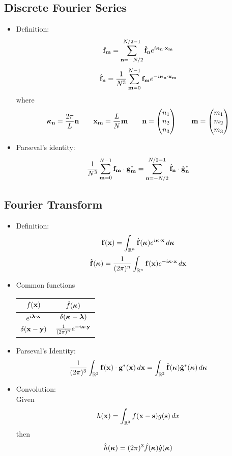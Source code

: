 \documentclass[oneside,a4paper,11pt]{article}
\begin{document}
\subsection{Discrete Fourier Series}
\begin{itemize}
\item Definition:
\[\mathbf{f}_{\mathbf{m}} = \sum_{\mathbf{n}=-N/2}^{N/2-1} \hat{\mathbf{f}}_{\mathbf{n}} e^{i \boldsymbol\kappa_{\mathbf{n}} \cdot \mathbf{x}_{\mathbf{m}}}\]
\[\hat{\mathbf{f}}_{\mathbf{n}} =\frac{1}{N^3}\sum_{\mathbf{m}=0}^{N-1} \mathbf{f}_{\mathbf{m}} e^{-i \boldsymbol\kappa_{\mathbf{n}} \cdot \mathbf{x}_{\mathbf{m}}}\]
 where 
 \[ \boldsymbol\kappa_{\mathbf{n}} = \frac{2 \pi}{L} \mathbf{n} \qquad \mathbf{x}_{\mathbf{m}} = \frac{L}{N}\mathbf{m} \qquad \mathbf{n} = \begin{pmatrix} n_1 \\ n_2 \\ n_3 \end{pmatrix} \qquad \mathbf{m} = \begin{pmatrix} m_1 \\ m_2 \\m_3 \end{pmatrix} \]
 
 \item Parseval's identity:
 \[ \frac{1}{N^3} \sum_{\mathbf{m}=0}^{N-1} \mathbf{f}_{\mathbf{m}} \cdot \mathbf{g}^*_{\mathbf{m}} = \sum_{\mathbf{n}=-N/2}^{N/2-1} \hat{ \mathbf{f} }_{\mathbf{n}} \cdot \hat{ \mathbf{g} }^*_{\mathbf{n}} \]
 \end{itemize}
 
\subsection{Fourier Transform}
\begin{itemize}
\item Definition:
\[\mathbf{f}(\mathbf{x}) = \int_{{\mathbb{R}^n}} \hat{\mathbf{f}}(\boldsymbol\kappa)e^{i\boldsymbol\kappa \cdot \mathbf{x}} \,d\boldsymbol\kappa \]
\[\hat{\mathbf{f}}(\boldsymbol\kappa) = \frac{1}{(2\pi)^n}\int_{{\mathbb{R}^n}} \mathbf{f}(\mathbf{x})e^{-i\boldsymbol\kappa \cdot \mathbf{x}} \,d\mathbf{x}\]

\item Common functions
\begin{center}
\begin{tabular}{|c|c|}
\hline
$f(\mathbf{x})$ & $\hat{f}(\boldsymbol\kappa)$ \\
\hline
$e^ {i \boldsymbol{\lambda} \cdot \mathbf{x}}$ & $\delta(\boldsymbol\kappa - \boldsymbol{\lambda})$ \\
\hline
$\delta(\mathbf{x} - \mathbf{y})$ & $\frac{1}{(2\pi)^n}e^{- i \boldsymbol\kappa \cdot \mathbf{y}} $ \\
\hline
\end{tabular}	
\end{center}

\item Parseval's Identity:
\[ \frac{1}{ ( 2 \pi )^3 } \int_{\mathbb{R}^3} \mathbf{f}(\mathbf{x}) \cdot \mathbf{g}^*(\mathbf{x}) \,d\mathbf{x} =  \int_{\mathbb{R}^3} \hat {\mathbf{f}}(\boldsymbol\kappa) \hat {\mathbf{g}}^*(\boldsymbol\kappa) \,d\boldsymbol\kappa \]

\item Convolution: \\
Given
\[ h( \mathbf{x} ) = \int_{{\mathbb{R}^3}} f( \mathbf{x} - \mathbf{s} )g( \mathbf{s} ) \, dx \]
then
\[\hat{h}(\boldsymbol\kappa) = (2\pi)^3 \hat{f}(\boldsymbol\kappa) \hat{g}(\boldsymbol\kappa) \]

\end{itemize}
\end{document}
